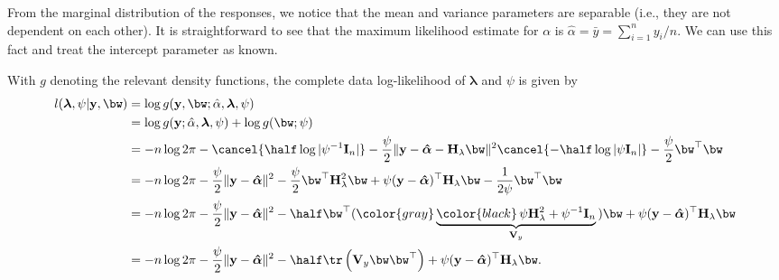 \documentclass[english, 11pt]{article}
\begin{document}
From the marginal distribution of the responses, we notice that the mean and variance parameters are separable (i.e., they are not dependent on each other). It is straightforward to see that the maximum likelihood estimate for $\alpha$ is $\hat\alpha = \bar y = \sum_{i=1}^n y_i / n$. We can use this fact and treat the intercept parameter as known.

With $g$ denoting the relevant density functions, the complete data log-likelihood of $\boldsymbol\lambda$ and $\psi$ is given by
\begin{align*}
	l(\boldsymbol{\lambda}, \psi|\mathbf y, \bw)
	&= \log g(\mathbf y, \bw; \hat\alpha, \boldsymbol{\lambda}, \psi) \\
	&= \log g(\mathbf y; \hat\alpha, \boldsymbol{\lambda}, \psi) + \log g(\bw; \psi)  \\
	&= - n \log 2\pi - \cancel{\half\log|\psi^{-1}\mathbf I_n|} - \frac{\psi}{2} \Vert \mathbf y - \boldsymbol{\hat\alpha} - \mathbf H_\lambda\bw \Vert^2 \cancel{ - \half\log|\psi\mathbf I_n|} - \frac{\psi}{2}\bw ^\top \bw  \\
	&= - n \log 2\pi - \frac{\psi}{2} \Vert \mathbf y - \boldsymbol{\hat\alpha} \Vert^2 - \frac{\psi}{2}\bw^\top\mathbf H_\lambda^2\bw + \psi(\mathbf y - \boldsymbol{\hat\alpha})^\top \mathbf H_\lambda\bw -\frac{1}{2\psi} \bw ^\top \bw  \\
	&= - n \log 2\pi - \frac{\psi}{2} \Vert \mathbf y - \boldsymbol{\hat\alpha} \Vert^2 - \half\bw^\top( {\color{gray} \underbrace{{\color{black} \, \psi\mathbf H_\lambda^2 + \psi^{-1}\mathbf I_n}}_{\mathbf V_y} \, } )\bw + \psi(\mathbf y - \boldsymbol{\hat\alpha})^\top \mathbf H_\lambda\bw \\
	&= - n \log 2\pi - \frac{\psi}{2} \Vert \mathbf y - \boldsymbol{\hat\alpha} \Vert^2 - \half \tr \left( \mathbf V_y  \bw \bw^\top \right) + \psi(\mathbf y - \boldsymbol{\hat\alpha})^\top \mathbf H_\lambda\bw.
\end{align*}
\end{document}
